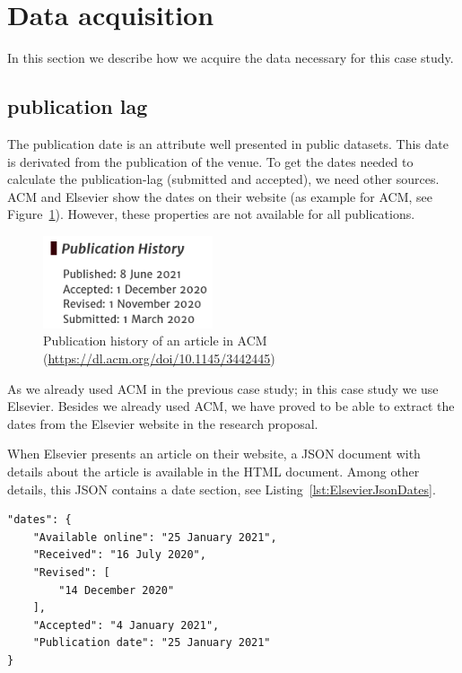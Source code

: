 \documentclass{ou-report}
\begin{document}
\section{Data acquisition}
In this section we describe how we acquire the data necessary for this case
study.
\subsection{publication lag}
The publication date is an attribute well presented in public datasets. This 
date is derivated from the publication of the venue. 
To get the dates needed to calculate the publication-lag (submitted and
accepted), we need other sources. ACM and Elsevier show the dates on their
website (as example for ACM, see Figure~\ref{fig:acm_dates}). However, these
properties are not available for all publications.

\begin{figure}[H]
\centering
\includegraphics[width=5cm]{ACM_Digital_Threats_Research_and_Practice.png}
\caption{Publication history of an article in ACM (\url{https://dl.acm.org/doi/10.1145/3442445})}
\label{fig:acm_dates}
\end{figure}

As we already used ACM in the previous case study; in this case study we
use Elsevier. Besides we already used ACM, we have proved to be able to extract
the dates from the Elsevier website in the research proposal.

When Elsevier presents an article on their website, a JSON 
document with details about the article is available in the HTML document. Among
other details, this JSON contains a date section, see 
Listing~\ref{lst:ElsevierJsonDates}.

\begin{lstlisting}[caption={Dates in the JSON document},label={lst:ElsevierJsonDates}]
"dates": {
    "Available online": "25 January 2021",
    "Received": "16 July 2020",
    "Revised": [
        "14 December 2020"
    ],
    "Accepted": "4 January 2021",
    "Publication date": "25 January 2021"
}
\end{lstlisting}
\end{document}
